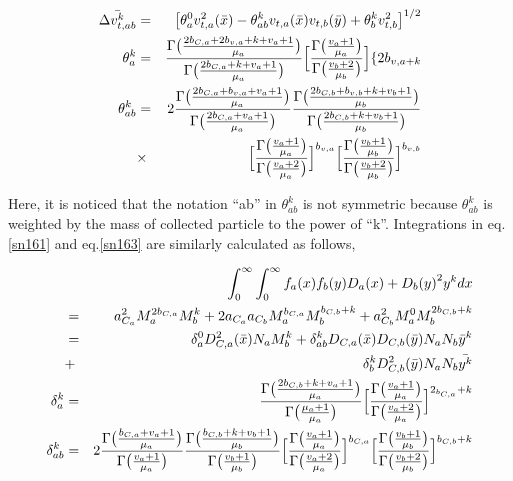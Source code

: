 \begin{eqnarray}
\bar{\Delta v_{t,ab}^{k}}&=&\bigl[\theta_{a}^{0}v_{t,a}^{2}(\bar{x})-\theta_{ab}^{k}v_{t,a}(\bar{x})v_{t,b}(\bar{y})+\theta_{b}^{k}v_{t,b}^{2}\bigr]^{1/2}\label{sn170}\\
\theta_{a}^{k}&=&\frac{\Gamma\bigl(\frac{2b_{C,a}+2b_{v,a}+k+v_{a}+1}{\mu_{a}}\bigr)}{\Gamma\bigl(\frac{2b_{C,a}+k+v_{a}+1}{\mu_{a}}\bigr)}\Bigl[\frac{\Gamma\bigl(\frac{v_{a}+1}{\mu_{a}}\bigr)}{\Gamma\bigl(\frac{v_{b}+2}{\mu_{b}}\bigr)}\Bigr]\{2b_{v,a+k}\label{sn171}\\
\theta_{ab}^{k}&=&2\frac{\Gamma\bigl(\frac{2b_{C,a}+b_{v,a}+v_{a}+1}{\mu_{a}}\bigr)}{\Gamma\bigl(\frac{2b_{C,a}+v_{a}+1}{\mu_{a}}\bigr)}\frac{\Gamma\bigl(\frac{2b_{C,b}+b_{v,b}+k+v_{b}+1}{\mu_{b}}\bigr)}{\Gamma\bigl(\frac{2b_{C,b}+k+v_{b}+1}{\mu_{b}}\bigr)}\nonumber\\
&\times&\Bigl[\frac{\Gamma\bigl(\frac{v_{a}+1}{\mu_{a}}\bigr)}{\Gamma\bigl(\frac{v_{a}+2}{\mu_{a}}\bigr)}\Bigr]^{b_{v,a}}\Bigl[\frac{\Gamma\bigl(\frac{v_{b}+1}{\mu_{b}}\bigr)}{\Gamma\bigl(\frac{v_{b}+2}{\mu_{b}}\bigr)}\Bigr]^{b_{v,b}}\label{sn172}
\end{eqnarray}

Here, it is noticed that the notation “ab” in $\theta_{ab}^{k}$ is not symmetric because $\theta_{ab}^{k}$ is weighted by the mass of collected particle to the power of “k”. Integrations in eq.\ref{sn161} and eq.\ref{sn163} are similarly calculated as follows, 


\begin{eqnarray}
& &\int_{0}^{\infty}\int_{0}^{\infty}f_{a}(x)f_{b}(y){D_{a}(x)+D_{b}(y)}^{2}y^{k}dx\nonumber\\
&=& a_{C_{a}}^{2}M_{a}^{2b_{C,a}}M_{b}^{k}+2a_{C_{a}}a_{C_{b}}M_{a}^{b_{C,a}}M_{b}^{b_{C,b}+k}+a_{C_{b}}^{2}M_{a}^{0}M_{b}^{2b_{C,b}+k}\nonumber\\
&=& \delta_{a}^{0}D_{C,a}^{2}(\bar{x})N_{a}M_{b}^{k}+\delta_{ab}^{k}D_{C,a}(\bar{x})D_{C,b}(\bar{y})N_{a}N_{b}\bar{y}^{k}\nonumber\\
&+&\delta_{b}^{k}D_{C,b}^{2}(\bar{y})N_{a}N_{b}\bar{y^{k}}\label{sn173}\\
\delta_{a}^{k}&=&\frac{\Gamma\bigl(\frac{2b_{C,b}+k+v_{a}+1}{\mu_{a}}\bigr)}{\Gamma\bigl(\frac{\mu_{a}+1}{\mu_{a}}\bigr)}\Bigl[\frac{\Gamma\bigl(\frac{v_{a}+1}{\mu_{a}}\bigr)}{\Gamma\bigl(\frac{v_{a}+2}{\mu_{a}}\bigr)}\Bigr]^{2_{b_{C,a}}+k}\label{sn174}\\
\delta_{ab}^{k}&=& 2\frac{\Gamma\bigl(\frac{b_{C,a}+v_{a}+1}{\mu_{a}}\bigr)}{\Gamma\bigl(\frac{v_{a}+1}{\mu_{a}}\bigr)}\frac{\Gamma\bigl(\frac{b_{C,b}+k+v_{b}+1}{\mu_{b}}\bigr)}{\Gamma\bigl(\frac{v_{b}+1}{\mu_{b}}\bigr)}\Bigl[\frac{\Gamma\bigl(\frac{v_{a}+1}{\mu_{a}}\bigr)}{\Gamma\bigl(\frac{v_{a}+2}{\mu_{a}}\bigr)}\Bigr]^{b_{C,a}}\Bigl[\frac{\Gamma\bigl(\frac{v_{b}+1}{\mu_{b}}\bigr)}{\Gamma\bigl(\frac{v_{b}+2}{\mu_{b}}\bigr)}\Bigr]^{b_{C,b}+k}\label{sn175}
\end{eqnarray}

